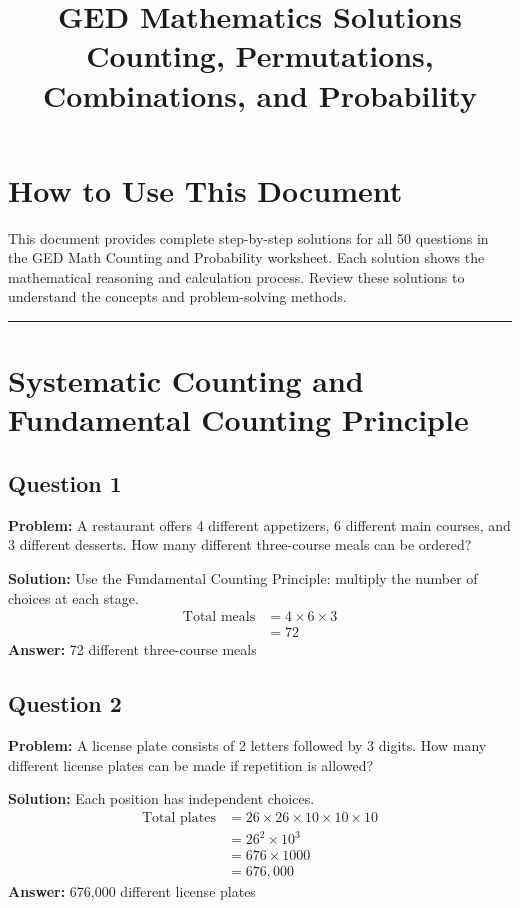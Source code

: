 \documentclass[12pt]{article}
\title{\Large \textbf{GED Mathematics Solutions} \\ Counting, Permutations, Combinations, and Probability}
\author{}
\date{}
\begin{document}
\maketitle

\section*{How to Use This Document}
This document provides complete step-by-step solutions for all 50 questions in the GED Math Counting and Probability worksheet. Each solution shows the mathematical reasoning and calculation process. Review these solutions to understand the concepts and problem-solving methods.

\vspace{0.5cm}
\noindent\rule{\textwidth}{1pt}

\section{Systematic Counting and Fundamental Counting Principle}

\subsection*{Question 1}
\textbf{Problem:} A restaurant offers 4 different appetizers, 6 different main courses, and 3 different desserts. How many different three-course meals can be ordered?

\textbf{Solution:} Use the Fundamental Counting Principle: multiply the number of choices at each stage.
\begin{align*}
\text{Total meals} &= 4 \times 6 \times 3 \\
&= 72
\end{align*}
\textbf{Answer:} 72 different three-course meals

\subsection*{Question 2}
\textbf{Problem:} A license plate consists of 2 letters followed by 3 digits. How many different license plates can be made if repetition is allowed?

\textbf{Solution:} Each position has independent choices.
\begin{align*}
\text{Total plates} &= 26 \times 26 \times 10 \times 10 \times 10 \\
&= 26^2 \times 10^3 \\
&= 676 \times 1000 \\
&= 676{,}000
\end{align*}
\textbf{Answer:} 676,000 different license plates
\end{document}

